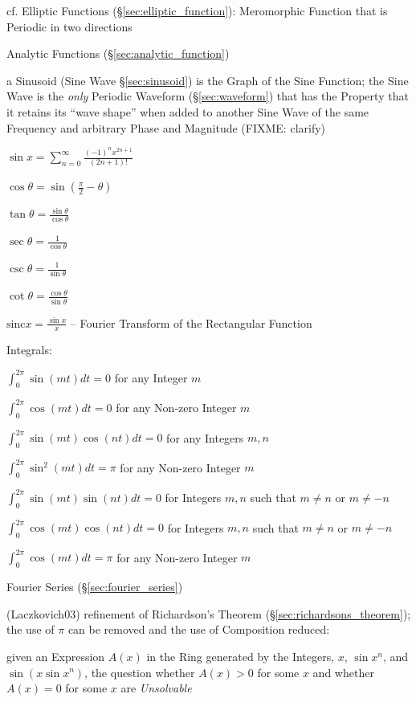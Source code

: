 cf. Elliptic Functions (\S\ref{sec:elliptic_function}): Meromorphic Function
that is Periodic in two directions

Analytic Functions (\S\ref{sec:analytic_function})

a Sinusoid (Sine Wave \S\ref{sec:sinusoid}) is the Graph of the Sine Function;
the Sine Wave is the \emph{only} Periodic Waveform (\S\ref{sec:waveform}) that
has the Property that it retains its ``wave shape'' when added to another Sine
Wave of the same Frequency and arbitrary Phase and Magnitude (FIXME: clarify)

$\sin x = \sum_{n=0}^\infty \frac{(-1)^n x^{2n+1}}{(2n + 1)!}$

$\cos\theta= \sin(\frac{\pi}{2} - \theta)$

$\tan\theta = \frac{\sin\theta}{\cos\theta}$

$\sec\theta = \frac{1}{\cos\theta}$

$\csc\theta = \frac{1}{\sin\theta}$

$\cot\theta = \frac{\cos\theta}{\sin\theta}$

$\mathrm{sinc} x = \frac{\sin x}{x}$ -- Fourier Transform of the Rectangular
Function

Integrals:

$\int_0^{2\pi} \sin(mt)dt = 0$ for any Integer $m$

$\int_0^{2\pi} \cos(mt)dt = 0$ for any Non-zero Integer $m$

$\int_0^{2\pi} \sin(mt)\cos(nt)dt = 0$ for any Integers $m,n$

$\int_0^{2\pi} \sin^2(mt)dt = \pi$ for any Non-zero Integer $m$

$\int_0^{2\pi} \sin(mt)\sin(nt)dt = 0$ for Integers $m,n$ such that $m\neq{n}$
or $m\neq{-n}$

$\int_0^{2\pi} \cos(mt)\cos(nt)dt = 0$ for Integers $m,n$ such that $m\neq{n}$
or $m\neq{-n}$

$\int_0^{2\pi} \cos(mt)dt = \pi$ for any Non-zero Integer $m$

\fist Fourier Series (\S\ref{sec:fourier_series})

(Laczkovich03) refinement of Richardson's Theorem
(\S\ref{sec:richardsons_theorem}); the use of $\pi$ can be removed and the use
of Composition reduced:

given an Expression $A(x)$ in the Ring generated by the Integers, $x$, $\sin
x^n$, and $\sin(x \sin x^n)$, the question whether $A(x) > 0$ for some $x$ and
whether $A(x) = 0$ for some $x$ are \emph{Unsolvable}



